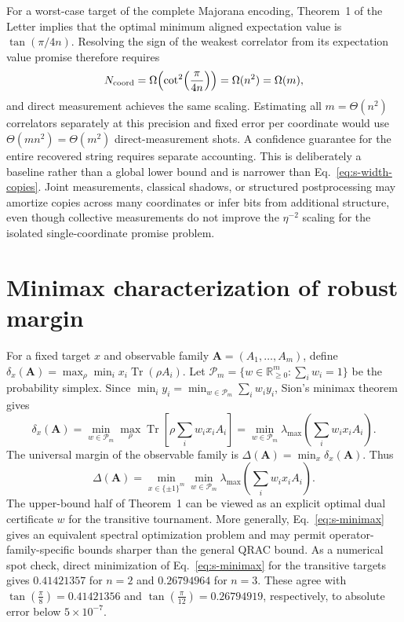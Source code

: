 \documentclass[10pt,aps,pra,twocolumn,superscriptaddress,nofootinbib,longbibliography]{revtex4-2}
\newcommand{\Tr}{\operatorname{Tr}}
\newcommand{\R}{\mathbb{R}}
\begin{document}
{For a worst-case target of the complete Majorana encoding, Theorem~1 of the Letter implies that the optimal minimum aligned expectation value is $\tan(\pi/4n)$.  Resolving the sign of the weakest correlator from its expectation value promise therefore requires
\begin{equation}
    N_{\rm coord}=\Omega\!\left(\cot^2\!\left(\frac{\pi}{4n}\right)\right)
    =\Omega(n^2)=\Omega(m),
    \label{eq:s-direct}
\end{equation}
and direct measurement achieves the same scaling.  Estimating all $m=\Theta(n^2)$ correlators separately at this precision and fixed error per coordinate would use $\Theta(mn^2)=\Theta(m^2)$ direct-measurement shots.  A confidence guarantee for the entire recovered string requires separate accounting.  This is deliberately a baseline rather than a global lower bound and is narrower than Eq.~\eqref{eq:s-width-copies}.  Joint measurements, classical shadows, or structured postprocessing may amortize copies across many coordinates or infer bits from additional structure, even though collective measurements do not improve the $\eta^{-2}$ scaling for the isolated single-coordinate promise problem.

\section{Minimax characterization of robust margin}
\label{supp:minimax}
For a fixed target $x$ and observable family $\mathbf A=(A_1,\ldots,A_m)$, define $\delta_x(\mathbf A)=\max_\rho\min_i x_i\Tr(\rho A_i)$.  Let $\mathcal P_m=\{w\in\R_{\ge0}^m:\sum_i w_i=1\}$ be the probability simplex.  Since $\min_i y_i=\min_{w\in\mathcal P_m}\sum_i w_i y_i$, Sion's minimax theorem gives~\cite{Sion1958Minimax}
\begin{equation}
    \delta_x(\mathbf A)
    =\min_{w\in\mathcal P_m}\max_\rho\Tr\!\left[\rho\sum_i w_i x_iA_i\right] =\min_{w\in\mathcal P_m}\lambda_{\max}\!\left(\sum_i w_i x_iA_i\right).
    \label{eq:s-minimax}
\end{equation}
The universal margin of the observable family is $\Delta(\mathbf A)=\min_x\delta_x(\mathbf A)$.  Thus
\begin{equation}
    \Delta(\mathbf A)=\min_{x\in\{\pm1\}^m}\min_{w\in\mathcal P_m}
    \lambda_{\max}\!\left(\sum_i w_i x_iA_i\right).
\end{equation}
The upper-bound half of Theorem~1 can be viewed as an explicit optimal dual certificate $w$ for the transitive tournament.  More generally, Eq.~\eqref{eq:s-minimax} gives an equivalent spectral optimization problem and may permit operator-family-specific bounds sharper than the general QRAC bound.  As a numerical spot check, direct minimization of Eq.~\eqref{eq:s-minimax} for the transitive targets gives $0.41421357$ for $n=2$ and $0.26794964$ for $n=3$.  These agree with $\tan\!\left(\frac{\pi}{8}\right)=0.41421356$ and $\tan\!\left(\frac{\pi}{12}\right)=0.26794919$, respectively, to absolute error below $5\times10^{-7}$.

}
\end{document}
